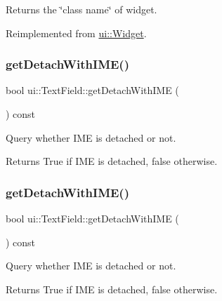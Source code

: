Returns the \char`\"{}class name\char`\"{} of widget. 

Reimplemented from \hyperlink{classui_1_1Widget_ad85abdaa9133dc6b8efc32670ae9b93f}{ui\+::\+Widget}.

\mbox{\label{classui_1_1TextField_a93e9883ab554e898380cc643a962126e}} 
\subsubsection{\texorpdfstring{get\+Detach\+With\+I\+M\+E()}{getDetachWithIME()}\hspace{0.1cm}{\footnotesize\ttfamily [1/2]}}
{\footnotesize\ttfamily bool ui\+::\+Text\+Field\+::get\+Detach\+With\+I\+ME (\begin{DoxyParamCaption}{ }\end{DoxyParamCaption}) const}



Query whether I\+ME is detached or not. 

\begin{DoxyReturn}{Returns}
True if I\+ME is detached, false otherwise. 
\end{DoxyReturn}
\mbox{\label{classui_1_1TextField_a93e9883ab554e898380cc643a962126e}} 
\subsubsection{\texorpdfstring{get\+Detach\+With\+I\+M\+E()}{getDetachWithIME()}\hspace{0.1cm}{\footnotesize\ttfamily [2/2]}}
{\footnotesize\ttfamily bool ui\+::\+Text\+Field\+::get\+Detach\+With\+I\+ME (\begin{DoxyParamCaption}{ }\end{DoxyParamCaption}) const}



Query whether I\+ME is detached or not. 

\begin{DoxyReturn}{Returns}
True if I\+ME is detached, false otherwise. 
\end{DoxyReturn}
\mbox{\label{classui_1_1TextField_adbd8af21c42d4273d2cdd62acb4d5da4}} 

